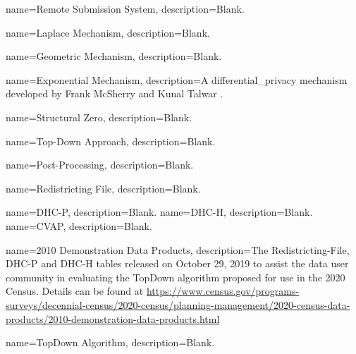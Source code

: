{
  name={Remote Submission System},
  description={Blank.}
}

{
    name=Laplace Mechanism,
    description={Blank.
    } 
}

{
    name=Geometric Mechanism,
    description={Blank.
    } 
}

{
    name=Exponential Mechanism,
    description={A \gls{differential_privacy} mechanism developed by Frank McSherry and Kunal Talwar \parencite{mcsherry_mechanism_2007}.
    } 
}

{
    name=Structural Zero,
    description={Blank.
    } 
}

{
    name=Top-Down Approach,
    description={Blank.
    } 
}

{
    name=Post-Processing,
    description={Blank.
    } 
}

{
name={Redistricting File},
description={Blank.}
}

{
name={DHC-P},
description={Blank.}
}
{
name={DHC-H},
description={Blank.}
}
{
name={CVAP},
description={Blank.}
}

{
    name=2010 Demonstration Data Products,
    description={The \gls{Redistricting-File}, \gls{DHC-P} and \gls{DHC-H} tables released on October 29, 2019 to assist the data user community in evaluating the \gls{TopDown} algorithm proposed for use in the 2020 Census. Details can be found at \url{https://www.census.gov/programs-surveys/decennial-census/2020-census/planning-management/2020-census-data-products/2010-demonstration-data-products.html}}
}

{
 name={TopDown Algorithm},
 description={Blank.}
}

